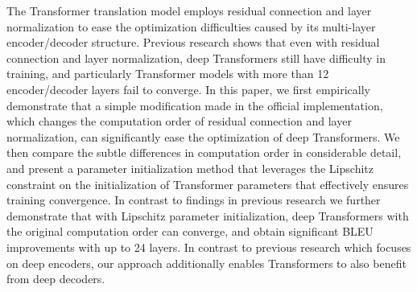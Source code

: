 The Transformer translation model employs residual connection and layer normalization to ease the optimization difficulties caused by its multi-layer encoder/decoder structure. Previous research shows that even with residual connection and layer normalization, deep Transformers still have difficulty in training, and particularly Transformer models with more than 12 encoder/decoder layers fail to converge. In this paper, we first empirically demonstrate that a simple modification made in the official implementation, which changes the computation order of residual connection and layer normalization, can significantly ease the optimization of deep Transformers. We then compare the subtle differences in computation order in considerable detail, and present a parameter initialization method that leverages the Lipschitz constraint on the initialization of Transformer parameters that effectively ensures training convergence. In contrast to findings in previous research we further demonstrate that with Lipschitz parameter initialization, deep Transformers with the original computation order can converge, and obtain significant BLEU improvements with up to 24 layers. In contrast to previous research which focuses on deep encoders, our approach additionally enables Transformers to also benefit from deep decoders.

